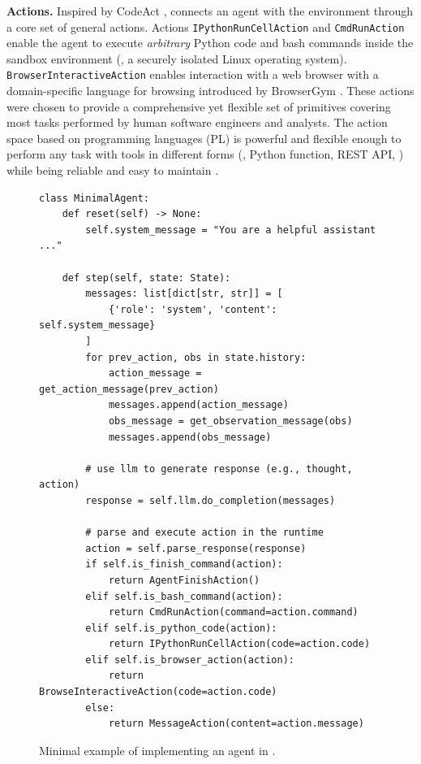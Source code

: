 \noindent \textbf{Actions.} Inspired by CodeAct \citep{wang2024executable}, \projname connects an agent with the environment through a core set of general actions.
Actions \texttt{IPythonRunCellAction} and \texttt{CmdRunAction} enable the agent to execute \textit{arbitrary} Python code and bash commands inside the sandbox environment (\eg, a securely isolated Linux operating system).
\texttt{BrowserInteractiveAction} enables interaction with a web browser with a domain-specific language for browsing introduced by BrowserGym \citep{workarena2024}.
These actions were chosen to provide a comprehensive yet flexible set of primitives covering most tasks performed by human software engineers and analysts.
The action space based on programming languages (PL) is powerful and flexible enough to perform any task with tools in different forms (\eg, Python function, REST API, \etc) while being reliable and easy to maintain \citep{wang2024executable} .


\begin{figure}
\begin{minipage}{0.6\textwidth}
\vspace{-0.4cm}
\caption{Minimal example of implementing an agent in \projname.}
\vspace{-0.4cm}
\label{algo:agent-abstraction}
\begin{verbatim}
class MinimalAgent:
    def reset(self) -> None:
        self.system_message = "You are a helpful assistant ..."

    def step(self, state: State):
        messages: list[dict[str, str]] = [
            {'role': 'system', 'content': self.system_message}
        ]
        for prev_action, obs in state.history:
            action_message = get_action_message(prev_action)
            messages.append(action_message)
            obs_message = get_observation_message(obs)
            messages.append(obs_message)

        # use llm to generate response (e.g., thought, action)
        response = self.llm.do_completion(messages)

        # parse and execute action in the runtime
        action = self.parse_response(response)
        if self.is_finish_command(action):
            return AgentFinishAction()
        elif self.is_bash_command(action):
            return CmdRunAction(command=action.command)
        elif self.is_python_code(action):
            return IPythonRunCellAction(code=action.code)
        elif self.is_browser_action(action):
            return BrowseInteractiveAction(code=action.code)
        else:
            return MessageAction(content=action.message)
\end{verbatim}
\end{minipage}
\vspace{-2cm}
\end{figure}

